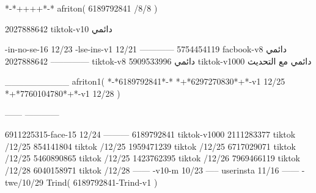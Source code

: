 *-*++++*-*
afriton(
6189792841 /8/8
)

2027888642 tiktok-v10
دائمي

-in-no-se-16 12/23
-lse-ins-v1 12/21
------------
5754454119 facbook-v8
دائمي
--------------
2027888642 tiktok-v8
دائمي
5909533996 tiktok-v1000
دائمي مع التحديث

__________
afriton1(
*-*6189792841*-*
*+*6297270830*+*-v1 12/25
*+*7760104780*+*-v1 12/28
)

------
------------

6911225315-face-15 12/24
---------
6189792841 tiktok-v1000
2111283377 tiktok /12/25
854141804 tiktok /12/25
1959471239 tiktok /12/25
6717029071 tiktok /12/25
5460890865 tiktok /12/25
1423762395 tiktok /12/26
7969466119 tiktok /12/28
6040158971 tiktok /12/28
------
-v10-m 10/23
-----
userinsta 11/16
------
-twe/10/29
Trind(
6189792841-Trind-v1 
)
